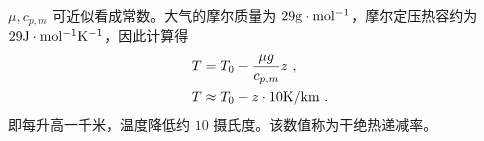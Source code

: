 $\mu,c_{p,m}$ 可近似看成常数。大气的摩尔质量为 $29 \rm{g\cdot mol^{-1}}$，摩尔定压热容约为 $29 \rm{J\cdot mol^{-1}K^{-1}}$，因此计算得
\begin{equation}
\begin{aligned}
&T=T_0-\frac{\mu g}{c_{p,m}} z~,\\
&T\approx T_0-z\cdot 10 \rm{K/km}~.
\end{aligned}
\end{equation}
即每升高一千米，温度降低约 $10$ 摄氏度。该数值称为干绝热递减率。